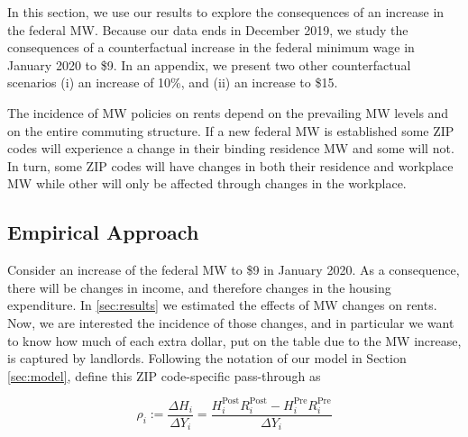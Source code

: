
In this section, we use our results to explore the consequences of an increase
in the federal MW.
Because our data ends in December 2019, we study the consequences of a 
counterfactual increase in the federal minimum wage in January 2020 to \$9. 
In an appendix, we present two other counterfactual scenarios (i) an increase of 10\%, 
and (ii) an increase to \$15. 


The incidence of MW policies on rents depend on the prevailing MW levels and on
the entire commuting structure. If a new federal MW is established some ZIP 
codes will experience a change in their binding residence MW and some will not. In turn, 
some ZIP codes will have changes in both their residence and workplace MW while other 
will only be affected through changes in the workplace.



\subsection{Empirical Approach}

Consider an increase of the federal MW to \$9 in January 2020. As a consequence, there 
will be changes in income, and therefore changes in the housing expenditure.
In \ref{sec:results} we estimated the effects of MW changes on rents. Now, we are interested 
the incidence of those changes, and in particular we want to know how much of each extra 
dollar, put on the table due to the MW increase, is captured by landlords. Following the 
notation of our model in Section \ref{sec:model}, define this ZIP code-specific pass-through 
as

\begin{equation*}\label{eq:pass_through}
    \rho_i := \frac{\Delta H_i}{\Delta Y_i} 
            = \frac{H^{\text{Post}}_i R^{\text{Post}}_i - H^{\text{Pre}}_i R^{\text{Pre}}_i}{\Delta Y_i}
\end{equation*}

